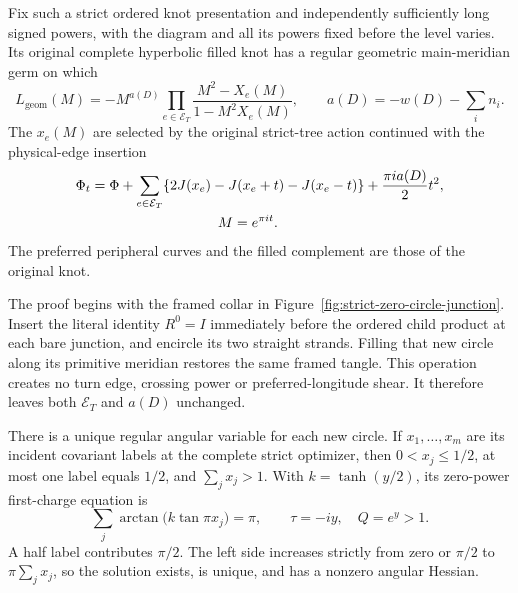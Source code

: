 \begin{theorem}
\label{gc:strict-longitude-theorem}
Fix such a strict ordered knot presentation and independently
sufficiently long signed powers, with the diagram and all its powers
fixed before the level varies. Its original complete hyperbolic
filled knot has a regular geometric main-meridian germ on which
\begin{equation}\label{gc:strict-longitude}
 L_{\mathrm{geom}}(M)
   =-M^{a(D)}\prod_{e\in\mathcal E_T}
           \frac{M^2-X_e(M)}{1-M^2X_e(M)},
 \qquad a(D)=-w(D)-\sum_i n_i.
\end{equation}
The $x_e(M)$ are selected by the original strict-tree action
continued with the physical-edge insertion
\begin{equation}\label{gc:strict-phase}
\begin{aligned}
 \Phi_t&=\Phi+\sum_{e\in\mathcal E_T}
       \{2J(x_e)-J(x_e+t)-J(x_e-t)\}
                 +\frac{\pi i a(D)}2t^2,\\
 &\hspace{32mm}M=e^{\pi it}.
\end{aligned}
\end{equation}
The preferred peripheral curves and the filled complement are those
of the original knot.
\end{theorem}

The proof begins with the framed collar in
Figure~\ref{fig:strict-zero-circle-junction}. Insert the literal
identity $R^0=I$ immediately before the ordered child product at
each bare junction, and encircle its two straight strands. Filling
that new circle along its primitive meridian restores the same
framed tangle. This operation creates no turn edge, crossing power
or preferred-longitude shear. It therefore leaves both
$\mathcal E_T$ and $a(D)$ unchanged.

There is a unique regular angular variable for each new circle.
If $x_1,\ldots,x_m$ are its incident covariant labels at the complete
strict optimizer, then $0<x_j\le1/2$, at most one label equals
$1/2$, and $\sum_jx_j>1$. With $k=\tanh(y/2)$, its zero-power
first-charge equation is
\begin{equation}\label{gc:zero-angular}
 \sum_j\arctan\bigl(k\tan\pi x_j\bigr)=\pi,
 \qquad \tau=-iy,\quad Q=e^y>1.
\end{equation}
A half label contributes $\pi/2$. The left side increases strictly
from zero or $\pi/2$ to $\pi\sum_jx_j$, so the solution exists,
is unique, and has a nonzero angular Hessian.

